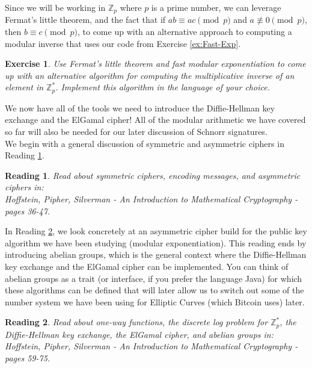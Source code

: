 \documentclass[12pt]{article}
\newcommand{\Z}[0]{\mathbb{Z}}
\newtheorem{exercise}{Exercise}
\newtheorem{reading}{Reading}
\theoremstyle{definition}
\theoremstyle{remark}
\theoremstyle{definition}
\begin{document}
Since we will be working in $\Z_p$ where $p$ is a prime number, we can leverage Fermat's little theorem, and the fact that if $ab\equiv ac\pmod p$ and $a\not\equiv 0\pmod p$, then $b\equiv c\pmod p$, to come up with an alternative approach to computing a modular inverse that uses our code from Exercise \ref{ex:Fast-Exp}.

\begin{exercise}\label{ex:prime-inverse}
Use Fermat’s little theorem and fast modular exponentiation to come up with an alternative algorithm for computing the multiplicative inverse of an element in $\Z_p^*$. Implement this algorithm in the language of your choice.
\end{exercise}

We now have all of the tools we need to introduce the Diffie-Hellman key exchange and the ElGamal cipher! All of the modular arithmetic we have covered so far will also be needed for our later discussion of Schnorr signatures.\\

We begin with a general discussion of symmetric and asymmetric ciphers in Reading \ref{ciphers}.

\begin{reading}\label{ciphers}
Read about symmetric ciphers, encoding messages, and asymmetric ciphers in:\\
Hoffstein, Pipher, Silverman - An Introduction to Mathematical Cryptography - pages 36-47.
\end{reading}

In Reading \ref{DH-crypto}, we look concretely at an asymmetric cipher build for the public key algorithm we have been studying (modular exponentiation). This reading ends by introducing abelian groups, which is the general context where the Diffie-Hellman key exchange and the ElGamal cipher can be implemented. You can think of abelian groups as a trait (or interface, if you prefer the language Java) for which these algorithms can be defined that will later allow us to switch out some of the number system we have been using for Elliptic Curves (which Bitcoin uses) later.

\begin{reading}\label{DH-crypto}
Read about one-way functions, the discrete log problem for $\Z_p^*$, the Diffie-Hellman key exchange, the ElGamal cipher, and abelian groups in:\\
Hoffstein, Pipher, Silverman - An Introduction to Mathematical Cryptography - pages 59-75.
\end{reading}
\end{document}
